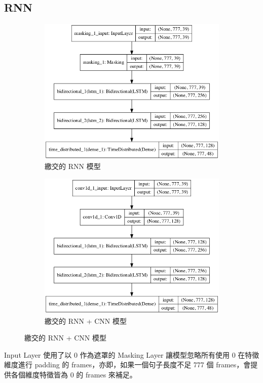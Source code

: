 \documentclass[final,3p]{elsarticle}
\begin{document}
	\subsection{RNN} 
	\label{sec:rnn}
		\begin{figure}[H]
			\begin{subfigure}{0.48\textwidth}
				\includegraphics[width=\linewidth]{images/rnn_mfcc}
				\caption{繳交的 RNN 模型} \label{fig:rnn}
			\end{subfigure}
			\begin{subfigure}{0.48\textwidth}
				\includegraphics[width=\linewidth]{images/cnn_mfcc}
				\caption{繳交的 RNN + CNN 模型} \label{fig:cnn}
			\end{subfigure}
		\end{figure}
		Input Layer 使用了以 0 作為遮罩的 Masking Layer 讓模型忽略所有使用 0 在特徵維度進行 padding 的 frames，亦即，如果一個句子長度不足 777 個 frames，會提供各個維度特徵皆為 0 的 frames 來補足。
		
\end{document}
